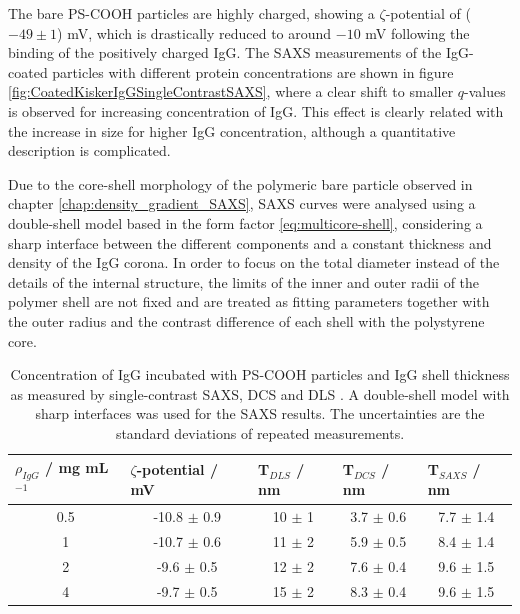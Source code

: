 The bare PS-COOH particles are highly charged, showing a $\zeta$-potential of ($-49 \pm 1$) mV, which is drastically reduced to around $ -10$ mV following the binding of the positively charged IgG. The SAXS measurements of the IgG-coated particles with different protein concentrations are shown in figure \ref{fig:CoatedKiskerIgGSingleContrastSAXS}, where a clear shift to smaller $q$-values is observed for increasing concentration of IgG. This effect is clearly related with the increase in size for higher IgG concentration, although a quantitative description is complicated.

Due to the core-shell morphology of the polymeric bare particle observed in chapter \ref{chap:density_gradient_SAXS}, SAXS curves were analysed using a double-shell model based in the form factor \ref{eq:multicore-shell}, considering a sharp interface between the different components and a constant thickness and density of the IgG corona. In order to focus on the total diameter instead of the details of the internal structure, the limits of the inner and outer radii of the polymer shell are not fixed and are treated as fitting parameters together with the outer radius and the contrast difference of each shell with the polystyrene core.

\begin{table}[]
\centering
\caption[Concentration of IgG and IgG shell thickness around the PS-COOH particles.]{Concentration of IgG incubated with PS-COOH particles and IgG shell thickness as measured by single-contrast SAXS, DCS and DLS \citep{minelli_characterization_2014}. A double-shell model with sharp interfaces was used for the SAXS results. The uncertainties are the standard deviations of repeated measurements.}
\label{tab:CoatedKiskerSingleContrast}
\begin{tabular}{|c|c|c|c|c|}
\hline
\multicolumn{1}{|l|}{\textbf{$\rho_{IgG}$ / mg mL$^{-1}$ }} & \multicolumn{1}{l|}{\textbf{$\zeta$-potential / mV}} & \multicolumn{1}{l|}{\textbf{T$_{DLS}$ / nm}} & \multicolumn{1}{l|}{\textbf{T$_{DCS}$ / nm}} & \multicolumn{1}{l|}{\textbf{T$_{SAXS}$ / nm}} \\ \hline
0.5                     & -10.8 $\pm$ 0.9                  & 10 $\pm$ 1              & 3.7 $\pm$ 0.6                                & 7.7 $\pm$ 1.4                                 \\ \hline
1                        & -10.7 $\pm$ 0.6                  & 11 $\pm$ 2              & 5.9 $\pm$ 0.5                                & 8.4 $\pm$ 1.4                                 \\ \hline
2                         & -9.6 $\pm$ 0.5                   & 12 $\pm$ 2              & 7.6 $\pm$ 0.4                                & 9.6 $\pm$ 1.5                                 \\ \hline
4                        & -9.7 $\pm$ 0.5                   & 15 $\pm$ 2              & 8.3 $\pm$ 0.4                                & 9.6 $\pm$ 1.5                                 \\ \hline
\end{tabular}
\end{table}

